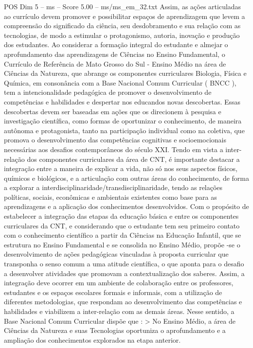 \begin{textsample}{POS Dim 5 – ms – Score 5.00 – ms/ms\_em\_32.txt}
Assim, as ações articuladas ao currículo devem promover e possibilitar espaços de aprendizagem que levem a compreensão do significado da ciência, seu desdobramento e sua relação com as tecnologias, de modo a estimular o protagonismo, autoria, inovação e produção dos estudantes.
Ao considerar a formação integral do estudante e almejar o aprofundamento das aprendizagens de Ciências no Ensino Fundamental, o Currículo de Referência de Mato Grosso do Sul - Ensino Médio na área de Ciências da Natureza, que abrange os componentes curriculares Biologia, Física e Química, em consonância com a Base Nacional Comum Curricular ( BNCC ), tem a intencionalidade pedagógica de promover o desenvolvimento de competências e habilidades e despertar nos educandos novas descobertas.
Essas descobertas devem ser baseadas em ações que os direcionem à pesquisa e investigação científica, como formas de oportunizar o conhecimento, de maneira autônoma e protagonista, tanto na participação individual como na coletiva, que promova o desenvolvimento das competências cognitivas e socioemocionais necessárias aos desafios contemporâneos do século XXI.
Tendo em vista a inter-relação dos componentes curriculares da área de CNT, é importante destacar a integração entre a maneira de explicar a vida, não só nos seus aspectos físicos, químicos e biológicos, e a articulação com outras áreas do conhecimento, de forma a explorar a interdisciplinaridade/transdisciplinaridade, tendo as relações políticas, sociais, econômicas e ambientais existentes como base para as aprendizagens e a aplicação dos conhecimentos desenvolvidos.
Com o propósito de estabelecer a integração das etapas da educação básica e entre os componentes curriculares da CNT, e considerando que o estudante tem seu primeiro contato com o conhecimento científico a partir da Ciências na Educação Infantil, que se estrutura no Ensino Fundamental e se consolida no Ensino Médio, propõe -se o desenvolvimento de ações pedagógicas vinculadas à proposta curricular que transponha o senso comum a uma atitude científica, o que aponta para o desafio a desenvolver atividades que promovam a contextualização dos saberes.
Assim, a integração deve ocorrer em um ambiente de colaboração entre os professores, estudantes e os espaços escolares formais e informais, com a utilização de diferentes metodologias, que respondam ao desenvolvimento das competências e habilidades e viabilizem a inter-relação com as demais áreas.
Nesse sentido, a Base Nacional Comum Curricular dispõe que : > No Ensino Médio, a área de Ciências da Natureza e suas Tecnologias oportuniza o aprofundamento e a ampliação dos conhecimentos explorados na etapa anterior.

\end{textsample}
